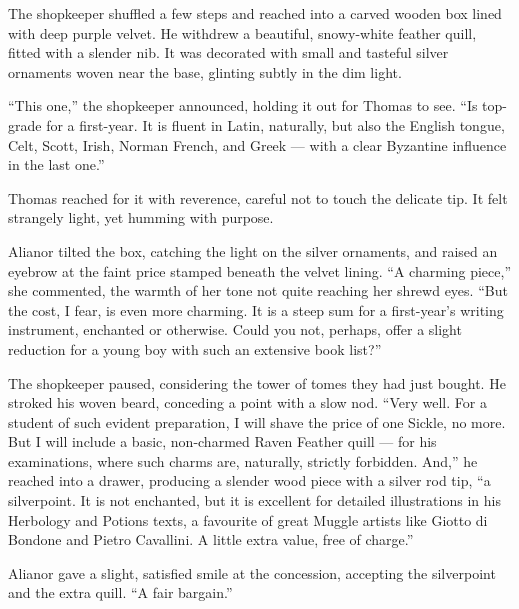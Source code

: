 The shopkeeper shuffled a few steps and reached into a carved wooden box lined with deep purple velvet. He withdrew a beautiful, snowy-white feather quill, fitted with a slender nib. It was decorated with small and tasteful silver ornaments woven near the base, glinting subtly in the dim light.
 
\enquote{This one,} the shopkeeper announced, holding it out for Thomas to see. \enquote{Is top-grade for a first-year. It is fluent in Latin, naturally, but also the English tongue, Celt, Scott, Irish, Norman French, and Greek --- with a clear Byzantine influence in the last one.}
 
Thomas reached for it with reverence, careful not to touch the delicate tip. It felt strangely light, yet humming with purpose.
 
Alianor tilted the box, catching the light on the silver ornaments, and raised an eyebrow at the faint price stamped beneath the velvet lining. \enquote{A charming piece,} she commented, the warmth of her tone not quite reaching her shrewd eyes. \enquote{But the cost, I fear, is even more charming. It is a steep sum for a first-year's writing instrument, enchanted or otherwise. Could you not, perhaps, offer a slight reduction for a young boy with such an extensive book list?}
 
The shopkeeper paused, considering the tower of tomes they had just bought. He stroked his woven beard, conceding a point with a slow nod. \enquote{Very well. For a student of such evident preparation, I will shave the price of one Sickle, no more. But I will include a basic, non-charmed Raven Feather quill --- for his examinations, where such charms are, naturally, strictly forbidden. And,} he reached into a drawer, producing a slender wood piece with a silver rod tip, \enquote{a silverpoint. It is not enchanted, but it is excellent for detailed illustrations in his Herbology and Potions texts, a favourite of great Muggle artists like Giotto di Bondone and Pietro Cavallini. A little extra value, free of charge.}
 
Alianor gave a slight, satisfied smile at the concession, accepting the silverpoint and the extra quill. \enquote{A fair bargain.}
 


















